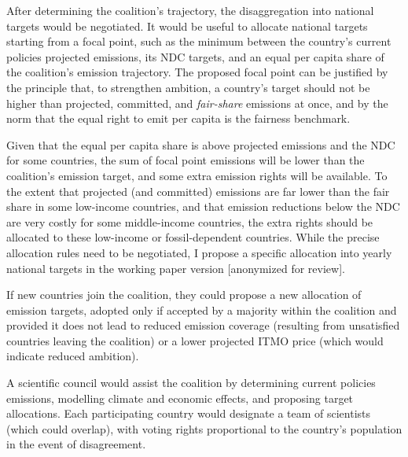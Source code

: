 \documentclass[12pt,english]{article}
\begin{document}
After determining the coalition's trajectory, the disaggregation into national targets would be negotiated. It would be useful to allocate national targets starting from a focal point, such as  %
the minimum between the country's current policies projected emissions, its NDC targets, and an equal per capita share of the coalition's emission trajectory. 
The proposed focal point can be justified by the principle that, to strengthen ambition, a country's target should not be higher than projected, committed, and \textit{fair-share} emissions at once, and by the norm that the equal right to emit per capita is the fairness benchmark. %

Given that the equal per capita share is above projected emissions %
and the NDC for some countries, the sum of focal point emissions will be lower than the coalition's emission target, and some extra emission rights will be available. To the extent that projected (and committed) emissions are far lower than the fair share in some low-income countries, and that emission reductions below the NDC are very costly for some middle-income countries, the extra rights should be allocated to these low-income or fossil-dependent countries. While the precise allocation rules need to be negotiated, I propose a specific allocation into yearly national targets in the working paper version [anonymized for review]. %

If new countries join the coalition, they could propose a new allocation of emission targets, adopted only if accepted by a majority within the coalition and provided it does not lead to reduced emission coverage (resulting from unsatisfied countries leaving the coalition) or a lower projected ITMO price (which would indicate reduced ambition). %

A scientific council would assist the coalition by determining current policies emissions, modelling climate and economic effects, and proposing target allocations. Each participating country would designate a team of scientists (which could overlap), with voting rights proportional to the country's population in the event of disagreement.
\end{document}
